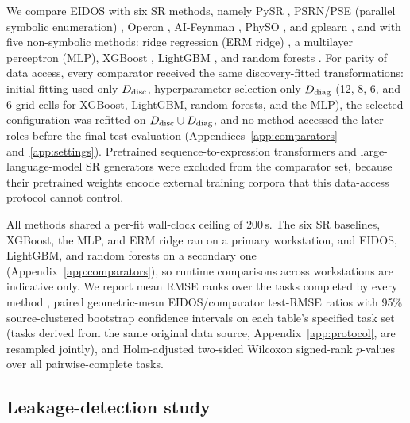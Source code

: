 We compare EIDOS with six SR methods, namely PySR \citep{cranmer2023pysr}, PSRN/PSE (parallel symbolic enumeration) \citep{ruan2026pse}, Operon \citep{burlacu2020operon}, AI-Feynman \citep{udrescu2020aifeynman}, PhySO \citep{tenachi2023physo}, and gplearn \citep{koza1992,stephens2015gplearn}, and with five non-symbolic methods: ridge regression (ERM ridge) \citep{hoerl1970ridge}, a multilayer perceptron (MLP), XGBoost \citep{chen2016xgboost}, LightGBM \citep{ke2017lightgbm}, and random forests \citep{breiman2001rf}. For parity of data access, every comparator received the same discovery-fitted transformations: initial fitting used only \(D_{\rm disc}\), hyperparameter selection only \(D_{\rm diag}\) (12, 8, 6, and 6 grid cells for XGBoost, LightGBM, random forests, and the MLP), the selected configuration was refitted on \(D_{\rm disc}\cup D_{\rm diag}\), and no method accessed the later roles before the final test evaluation (Appendices~\ref{app:comparators} and~\ref{app:settings}). Pretrained sequence-to-expression transformers and large-language-model SR generators \citep{kamienny2022e2e,shojaee2025llmsr} were excluded from the comparator set, because their pretrained weights encode external training corpora that this data-access protocol cannot control.

All methods shared a per-fit wall-clock ceiling of \(200\)\,s. The six SR baselines, XGBoost, the MLP, and ERM ridge ran on a primary workstation, and EIDOS, LightGBM, and random forests on a secondary one (Appendix~\ref{app:comparators}), so runtime comparisons across workstations are indicative only. We report mean RMSE ranks over the tasks completed by every method \citep{demsar2006}, paired geometric-mean EIDOS/comparator test-RMSE ratios with 95\% source-clustered bootstrap confidence intervals on each table's specified task set (tasks derived from the same original data source, Appendix~\ref{app:protocol}, are resampled jointly), and Holm-adjusted two-sided Wilcoxon signed-rank \(p\)-values \citep{wilcoxon1945,holm1979} over all pairwise-complete tasks.

\subsection{Leakage-detection study}\label{sec:leakdesign}

